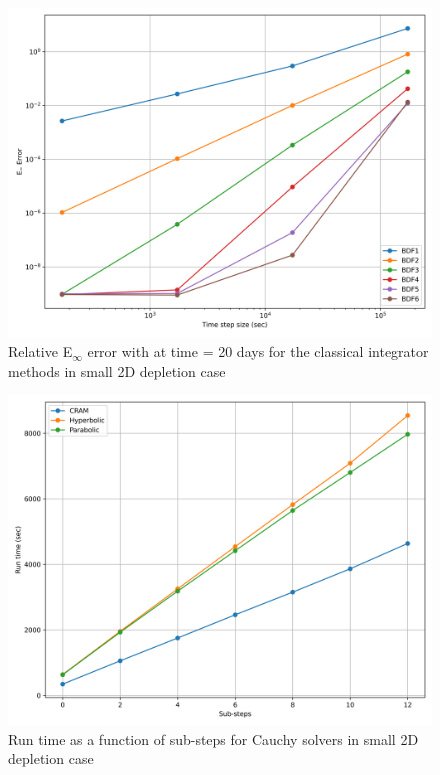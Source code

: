 \begin{figure}[p]
    \centering
    \includegraphics[width=5in]{images/chapter-5/caseStudies/small2DDepletion/msrSmall2DDepletionEinfErrorerrorIntegrators.png}
    \caption{Relative E$_{\infty}$ error with at time = 20 days for the classical integrator methods in small 2D depletion case}
    \label{fig:small_2D_depletion_Einf_integrators}
\end{figure}

\clearpage

\begin{figure}[p]
    \centering
    \includegraphics[width=5in]{images/chapter-5/caseStudies/small2DDepletion/msr2DDepletionSmallCauchyRuntimes.png}
    \caption{Run time as a function of sub-steps for Cauchy solvers in small 2D depletion case}
    \label{fig:small_2D_depletion_Cauchy_runtimes}
\end{figure}

